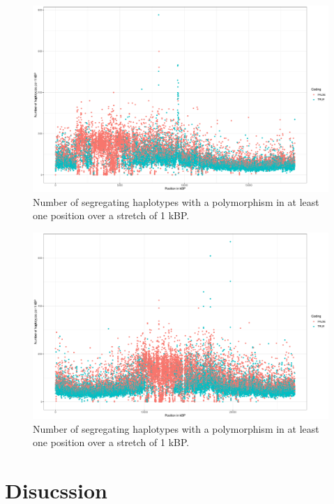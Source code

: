 \begin{figure}[th]
\centering
\includegraphics[height=.55\textheight, width=1.1\textwidth]{Figures/chr4_hap}
\decoRule
\caption[Haplotype strutcture of chromosome 4 of \textit{A. thaliana}]{Number of segregating haplotypes with a polymorphism in at least one position over a stretch of 1 kBP. }
\label{fig:chr4}
\end{figure}


\begin{figure}[th]
\centering
\includegraphics[height=.55\textheight, width=1.1\textwidth]{Figures/chr5_hap}
\decoRule
\caption[Haplotype strutcture of chromosome 5 of \textit{A. thaliana}]{Number of segregating haplotypes with a polymorphism in at least one position over a stretch of 1 kBP. }
\label{fig:chr5}
\end{figure}





\section{Disucssion}


